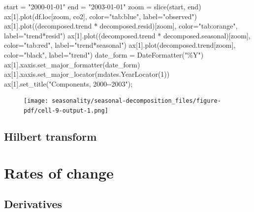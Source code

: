 \documentclass[
  letterpaper,
  DIV=11,
  numbers=noendperiod,
  oneside]{scrreprt}
\newenvironment{Shaded}{\begin{snugshade}}{\end{snugshade}}
\newcommand{\BuiltInTok}[1]{\textcolor[rgb]{0.00,0.23,0.31}{#1}}
\newcommand{\DecValTok}[1]{\textcolor[rgb]{0.68,0.00,0.00}{#1}}
\newcommand{\NormalTok}[1]{\textcolor[rgb]{0.00,0.23,0.31}{#1}}
\newcommand{\OperatorTok}[1]{\textcolor[rgb]{0.37,0.37,0.37}{#1}}
\newcommand{\StringTok}[1]{\textcolor[rgb]{0.13,0.47,0.30}{#1}}
\begin{document}
\begin{Shaded}
\begin{Highlighting}[]
\NormalTok{start }\OperatorTok{=} \StringTok{"2000{-}01{-}01"}
\NormalTok{end }\OperatorTok{=} \StringTok{"2003{-}01{-}01"}
\NormalTok{zoom }\OperatorTok{=} \BuiltInTok{slice}\NormalTok{(start, end)}
\NormalTok{ax[}\DecValTok{1}\NormalTok{].plot(df.loc[zoom, }\StringTok{\textquotesingle{}co2\textquotesingle{}}\NormalTok{], color}\OperatorTok{=}\StringTok{"tab:blue"}\NormalTok{, label}\OperatorTok{=}\StringTok{"observed"}\NormalTok{)}
\NormalTok{ax[}\DecValTok{1}\NormalTok{].plot((decomposed.trend }\OperatorTok{*}\NormalTok{ decomposed.resid)[zoom], color}\OperatorTok{=}\StringTok{"tab:orange"}\NormalTok{, label}\OperatorTok{=}\StringTok{"trend*resid"}\NormalTok{)}
\NormalTok{ax[}\DecValTok{1}\NormalTok{].plot((decomposed.trend }\OperatorTok{*}\NormalTok{ decomposed.seasonal)[zoom], color}\OperatorTok{=}\StringTok{"tab:red"}\NormalTok{, label}\OperatorTok{=}\StringTok{"trend*seasonal"}\NormalTok{)}
\NormalTok{ax[}\DecValTok{1}\NormalTok{].plot(decomposed.trend[zoom], color}\OperatorTok{=}\StringTok{"black"}\NormalTok{, label}\OperatorTok{=}\StringTok{"trend"}\NormalTok{)}
\NormalTok{date\_form }\OperatorTok{=}\NormalTok{ DateFormatter(}\StringTok{"\%Y"}\NormalTok{)}
\NormalTok{ax[}\DecValTok{1}\NormalTok{].xaxis.set\_major\_formatter(date\_form)}
\NormalTok{ax[}\DecValTok{1}\NormalTok{].xaxis.set\_major\_locator(mdates.YearLocator(}\DecValTok{1}\NormalTok{))}
\NormalTok{ax[}\DecValTok{1}\NormalTok{].set\_title(}\StringTok{"Components, 2000{-}{-}2003"}\NormalTok{)}\OperatorTok{;}
\end{Highlighting}
\end{Shaded}

\begin{figure}[H]

{\centering \texttt{[image: seasonality/seasonal-decomposition\_files/figure-pdf/cell-9-output-1.png]}

}

\end{figure}

\hypertarget{hilbert-transform}{%
\chapter{Hilbert transform}\label{hilbert-transform}}

\part{Rates of change}

\hypertarget{derivatives}{%
\chapter{Derivatives}\label{derivatives}}
\end{document}

